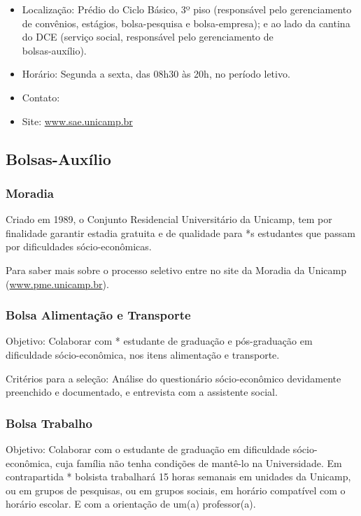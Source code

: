 \begin{itemize}
    \item  Localização: Prédio do Ciclo Básico, 3º piso (responsável pelo
        gerenciamento de convênios, estágios, bolsa-pesquisa e bolsa-empresa); e
        ao lado da cantina do DCE (serviço social, responsável pelo gerenciamento 
        de\\ bolsas-auxílio).
    \item  Horário: Segunda a sexta, das 08h30 às 20h, no período letivo.
    \item  Contato: 
    \item  Site: \url{www.sae.unicamp.br}
\end{itemize}

\subsection{Bolsas-Auxílio}
\subsubsection{Moradia}

Criado em 1989, o Conjunto Residencial Universitário da Unicamp, tem por
finalidade garantir estadia gratuita e de qualidade para *s estudantes que
passam por dificuldades sócio-econômicas.

Para saber mais sobre o processo seletivo entre no site da Moradia da Unicamp
(\url{www.pme.unicamp.br}).

\subsubsection{Bolsa Alimentação e Transporte}

Objetivo: Colaborar com * estudante de graduação e pós-graduação em dificuldade
sócio-econômica, nos itens alimentação e transporte.

Critérios para a seleção: Análise do questionário sócio-econômico devidamente
preenchido e documentado, e entrevista com a assistente social.

\subsubsection{Bolsa Trabalho}

Objetivo: Colaborar com o estudante de graduação em dificuldade sócio-econômica,
cuja família não tenha condições de mantê-lo na Universidade. Em contrapartida *
bolsista trabalhará 15 horas semanais em unidades da Unicamp, ou em grupos de
pesquisas, ou em grupos sociais, em horário compatível com o horário escolar.  E
com a orientação de um(a) professor(a).


